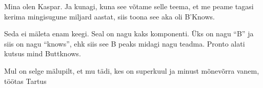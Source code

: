 

Mina olen Kaspar. Ja kunagi, kuna see võtame selle teema, et me peame tagasi kerima mingisugune miljard aastat, siis toona see aka oli B'Knows. 


Seda ei mäleta enam keegi. Seal on nagu kaks komponenti. Üks on nagu \enquote{B} ja siis on nagu \enquote{knows}, ehk siis see B peaks  midagi nagu teadma. Pronto alati kutsus mind Buttknows.


Mul on selge mälupilt, et mu tädi, kes on superkuul ja minust mõnevõrra vanem, töötas Tartus
